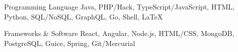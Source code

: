 


\begin{cvskills}


	\cvskill
	{Programming Language} %
	{Java, PHP/Hack, TypeScript/JavaScript, HTML, Python, SQL/NoSQL, GraphQL, Go, Shell, \textrm{\LaTeX}} %


	\cvskill
	{Frameworks \& Software} %
	{React, Angular, Node.js, HTML/CSS, MongoDB, PostgreSQL, Guice, Spring, Git/Mercurial} %


\end{cvskills}